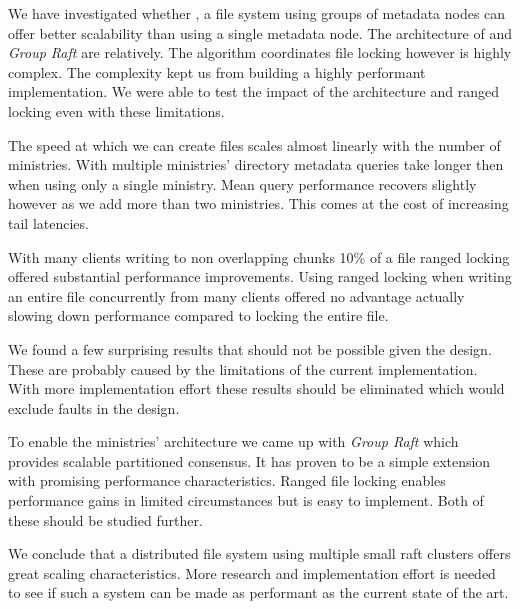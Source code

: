 We have investigated whether \name{}, a file system using groups of metadata nodes can offer better scalability than using a single metadata node. The architecture of \name{} and \textit{Group Raft} are relatively. The algorithm coordinates file locking however is highly complex. The complexity kept us from building a highly performant implementation. We were able to test the impact of the architecture and ranged locking even with these limitations.

The speed at which we can create files scales almost linearly with the number of ministries. With multiple ministries' directory metadata queries take longer then when using only a single ministry. Mean query performance recovers slightly however as we add more than two ministries. This comes at the cost of increasing tail latencies.

With many clients writing to non overlapping chunks 10\% of a file ranged locking offered substantial performance improvements. Using ranged locking when writing an entire file concurrently from many clients offered no advantage actually slowing down performance compared to locking the entire file.

We found a few surprising results that should not be possible given the design. These are probably caused by the limitations of the current implementation. With more implementation effort these results should be eliminated which would exclude faults in the design.

To enable the ministries' architecture we came up with \textit{Group Raft} which provides scalable partitioned consensus. It has proven to be a simple extension with promising performance characteristics. Ranged file locking enables performance gains in limited circumstances but is easy to implement. Both of these should be studied further. 

We conclude that a distributed file system using multiple small raft clusters offers great scaling characteristics. More research and implementation effort is needed to see if such a system can be made as performant as the current state of the art.
